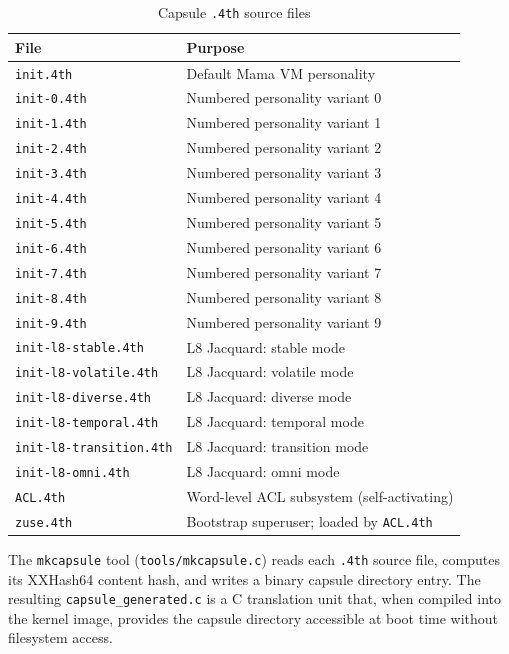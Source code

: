 \begin{table}[ht]
  \centering
  \caption{Capsule \texttt{.4th} source files}
  \label{tab:capsule-files}
  \begin{tabular}{ll}
    \toprule
    File & Purpose \\
    \midrule
    \texttt{init.4th}            & Default Mama VM personality \\
    \texttt{init-0.4th}          & Numbered personality variant 0 \\
    \texttt{init-1.4th}          & Numbered personality variant 1 \\
    \texttt{init-2.4th}          & Numbered personality variant 2 \\
    \texttt{init-3.4th}          & Numbered personality variant 3 \\
    \texttt{init-4.4th}          & Numbered personality variant 4 \\
    \texttt{init-5.4th}          & Numbered personality variant 5 \\
    \texttt{init-6.4th}          & Numbered personality variant 6 \\
    \texttt{init-7.4th}          & Numbered personality variant 7 \\
    \texttt{init-8.4th}          & Numbered personality variant 8 \\
    \texttt{init-9.4th}          & Numbered personality variant 9 \\
    \texttt{init-l8-stable.4th}  & L8 Jacquard: stable mode \\
    \texttt{init-l8-volatile.4th}& L8 Jacquard: volatile mode \\
    \texttt{init-l8-diverse.4th} & L8 Jacquard: diverse mode \\
    \texttt{init-l8-temporal.4th}& L8 Jacquard: temporal mode \\
    \texttt{init-l8-transition.4th} & L8 Jacquard: transition mode \\
    \texttt{init-l8-omni.4th}    & L8 Jacquard: omni mode \\
    \texttt{ACL.4th}             & Word-level ACL subsystem (self-activating) \\
    \texttt{zuse.4th}            & Bootstrap superuser; loaded by \texttt{ACL.4th} \\
    \bottomrule
  \end{tabular}
\end{table}

The \texttt{mkcapsule} tool (\texttt{tools/mkcapsule.c}) reads each
\texttt{.4th} source file, computes its XXHash64 content hash, and writes
a binary capsule directory entry. The resulting \texttt{capsule\_generated.c}
is a C translation unit that, when compiled into the kernel image, provides
the capsule directory accessible at boot time without filesystem access.

